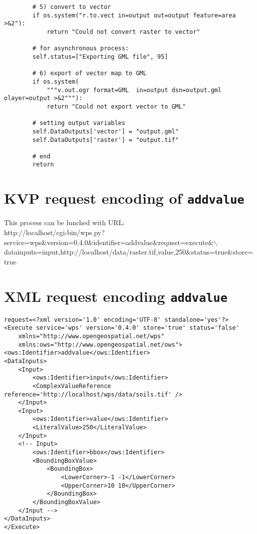 \documentclass[a4paper,11pt]{article}
\begin{document}
\begin{verbatim}
        # 5) convert to vector
        if os.system("r.to.vect in=output out=output feature=area >&2"):
            return "Could not convert raster to vector"

        # for asynchronous process:
        self.status=["Exporting GML file", 95]

        # 6) export of vector map to GML
        if os.system(
            """v.out.ogr format=GML  in=output dsn=output.gml olayer=output >&2"""):
            return "Could not export vector to GML"

        # setting output variables
        self.DataOutputs['vector'] = "output.gml"
        self.DataOutputs['raster'] = "output.tif"

        # end
        return

    \end{verbatim}

    \section{KVP request encoding of \texttt{addvalue}}
    This process can be lunched with URL:\\
    http://localhost/cgi-bin/wps.py?service=wps\&version=0.4.0\&identifier=addvalue\&request=execute\&$\backslash$\\
    datainputs=input,http://localhost/data/raster.tif,value,250\&status=true\&store=true

    \section{XML request encoding \texttt{addvalue}}
\begin{verbatim}
request=<?xml version='1.0' encoding='UTF-8' standalone='yes'?>
<Execute service='wps' version='0.4.0' store='true' status='false'
    xmlns="http://www.opengeospatial.net/wps"
    xmlns:ows="http://www.opengeospatial.net/ows">
<ows:Identifier>addvalue</ows:Identifier>
<DataInputs>
    <Input>
        <ows:Identifier>input</ows:Identifier>
        <ComplexValueReference reference='http://localhost/wps/data/soils.tif' />
    </Input>
    <Input>
        <ows:Identifier>value</ows:Identifier>
        <LiteralValue>250</LiteralValue>
    </Input>
    <!-- Input>
        <ows:Identifier>bbox</ows:Identifier>
        <BoundingBoxValue>
            <BoundingBox>
                <LowerCorner>-1 -1</LowerCorner>
                <UpperCorner>10 10</UpperCorner>
            </BoundingBox>
        </BoundingBoxValue>
    </Input -->
</DataInputs>
</Execute>
\end{verbatim}
\end{document}
